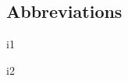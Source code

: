 \subsection*{Abbreviations}

\begin{abbreviations}
    \item \ac{i1}
    \item \ac{i2}
\end{abbreviations}
